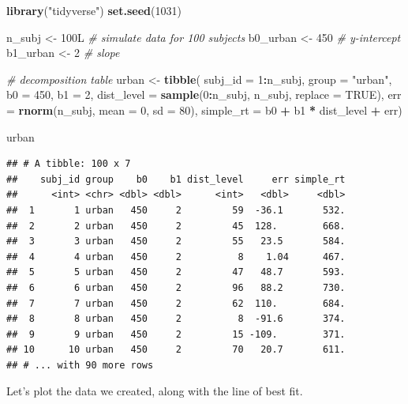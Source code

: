 \documentclass[]{book}
\newenvironment{Shaded}{\begin{snugshade}}{\end{snugshade}}
\newcommand{\CommentTok}[1]{\textcolor[rgb]{0.56,0.35,0.01}{\textit{#1}}}
\newcommand{\DataTypeTok}[1]{\textcolor[rgb]{0.13,0.29,0.53}{#1}}
\newcommand{\DecValTok}[1]{\textcolor[rgb]{0.00,0.00,0.81}{#1}}
\newcommand{\KeywordTok}[1]{\textcolor[rgb]{0.13,0.29,0.53}{\textbf{#1}}}
\newcommand{\NormalTok}[1]{#1}
\newcommand{\OperatorTok}[1]{\textcolor[rgb]{0.81,0.36,0.00}{\textbf{#1}}}
\newcommand{\OtherTok}[1]{\textcolor[rgb]{0.56,0.35,0.01}{#1}}
\newcommand{\StringTok}[1]{\textcolor[rgb]{0.31,0.60,0.02}{#1}}
\begin{document}
\begin{Shaded}
\begin{Highlighting}[]
\KeywordTok{library}\NormalTok{(}\StringTok{"tidyverse"}\NormalTok{)}
\KeywordTok{set.seed}\NormalTok{(}\DecValTok{1031}\NormalTok{)}

\NormalTok{n_subj <-}\StringTok{ }\NormalTok{100L  }\CommentTok{# simulate data for 100 subjects}
\NormalTok{b0_urban <-}\StringTok{ }\DecValTok{450} \CommentTok{# y-intercept}
\NormalTok{b1_urban <-}\StringTok{ }\DecValTok{2}   \CommentTok{# slope}

\CommentTok{# decomposition table}
\NormalTok{urban <-}\StringTok{ }\KeywordTok{tibble}\NormalTok{(}
  \DataTypeTok{subj_id =} \DecValTok{1}\OperatorTok{:}\NormalTok{n_subj,}
  \DataTypeTok{group =} \StringTok{"urban"}\NormalTok{,}
  \DataTypeTok{b0 =} \DecValTok{450}\NormalTok{,}
  \DataTypeTok{b1 =} \DecValTok{2}\NormalTok{,}
  \DataTypeTok{dist_level =} \KeywordTok{sample}\NormalTok{(}\DecValTok{0}\OperatorTok{:}\NormalTok{n_subj, n_subj, }\DataTypeTok{replace =} \OtherTok{TRUE}\NormalTok{),}
  \DataTypeTok{err =} \KeywordTok{rnorm}\NormalTok{(n_subj, }\DataTypeTok{mean =} \DecValTok{0}\NormalTok{, }\DataTypeTok{sd =} \DecValTok{80}\NormalTok{),}
  \DataTypeTok{simple_rt =}\NormalTok{ b0 }\OperatorTok{+}\StringTok{ }\NormalTok{b1 }\OperatorTok{*}\StringTok{ }\NormalTok{dist_level }\OperatorTok{+}\StringTok{ }\NormalTok{err)}

\NormalTok{urban}
\end{Highlighting}
\end{Shaded}

\begin{verbatim}
## # A tibble: 100 x 7
##    subj_id group    b0    b1 dist_level     err simple_rt
##      <int> <chr> <dbl> <dbl>      <int>   <dbl>     <dbl>
##  1       1 urban   450     2         59  -36.1       532.
##  2       2 urban   450     2         45  128.        668.
##  3       3 urban   450     2         55   23.5       584.
##  4       4 urban   450     2          8    1.04      467.
##  5       5 urban   450     2         47   48.7       593.
##  6       6 urban   450     2         96   88.2       730.
##  7       7 urban   450     2         62  110.        684.
##  8       8 urban   450     2          8  -91.6       374.
##  9       9 urban   450     2         15 -109.        371.
## 10      10 urban   450     2         70   20.7       611.
## # ... with 90 more rows
\end{verbatim}

Let's plot the data we created, along with the line of best fit.
\end{document}
